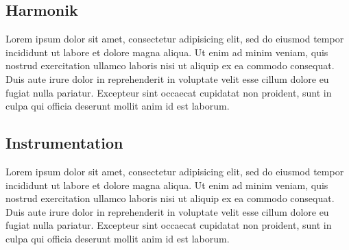 \subsection{Harmonik}

Lorem ipsum dolor sit amet, consectetur adipisicing elit, sed do eiusmod tempor incididunt ut labore et dolore magna aliqua. Ut enim ad minim veniam, quis nostrud exercitation ullamco laboris nisi ut aliquip ex ea commodo consequat. Duis aute irure dolor in reprehenderit in voluptate velit esse cillum dolore eu fugiat nulla pariatur. Excepteur sint occaecat cupidatat non proident, sunt in culpa qui officia deserunt mollit anim id est laborum.



\subsection{Instrumentation}

Lorem ipsum dolor sit amet, consectetur adipisicing elit, sed do eiusmod tempor incididunt ut labore et dolore magna aliqua. Ut enim ad minim veniam, quis nostrud exercitation ullamco laboris nisi ut aliquip ex ea commodo consequat. Duis aute irure dolor in reprehenderit in voluptate velit esse cillum dolore eu fugiat nulla pariatur. Excepteur sint occaecat cupidatat non proident, sunt in culpa qui officia deserunt mollit anim id est laborum.
